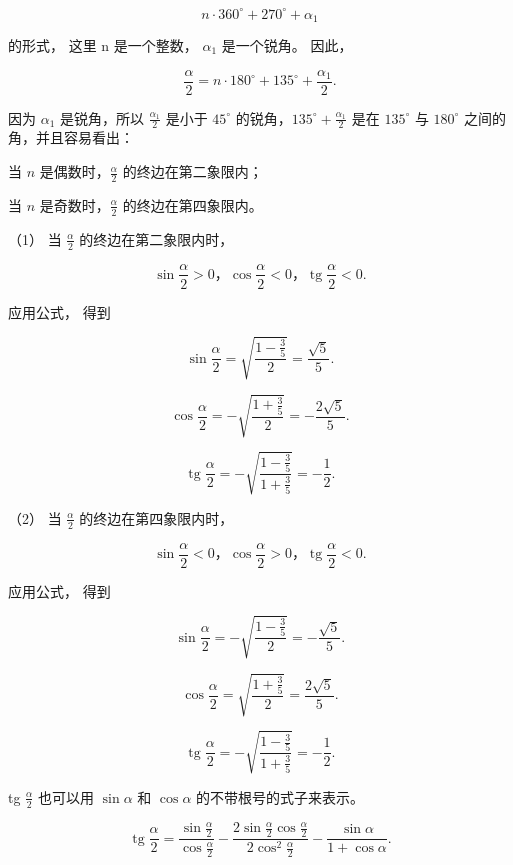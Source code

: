 \[
n\cdot360^{\circ} + 270 ^{\circ} + \alpha_ {1}
\]

的形式， 这里 n 是一个整数， \(\alpha_{1}\) 是一个锐角。 因此，

\[
\frac {\alpha}{2} = n \cdot 180 ^{\circ} + 135 ^{\circ} + \frac {\alpha_ {1}}{2}.
\]

因为 \(\alpha_{1}\) 是锐角，所以 \(\frac{\alpha_{1}}{2}\) 是小于
\(45^{\circ}\) 的锐角，\(135^{\circ} + \frac{\alpha_{1}}{2}\) 是在
\(135^{\circ}\) 与 \(180^{\circ}\) 之间的角，并且容易看出：

当 \(n\) 是偶数时，\(\frac{\alpha}{2}\) 的终边在第二象限内；

当 \(n\) 是奇数时，\(\frac{\alpha}{2}\) 的终边在第四象限内。

（1） 当 \(\frac{\alpha}{2}\) 的终边在第二象限内时，

\[
\sin \frac {\alpha}{2} > 0\text{，} \cos \frac {\alpha}{2} <   0\text{，} \operatorname{tg} \frac {\alpha}{2} <   0.
\]

应用公式， 得到

\[
\sin \frac {\alpha}{2} = \sqrt {\frac {1 - \frac {3}{5}}{2}} = \frac {\sqrt {5}}{5}.
\]

\[
\cos \frac {\alpha}{2} = - \sqrt {\frac {1 + \frac {3}{5}}{2}} = - \frac {2 \sqrt {5}}{5}.
\]

\[
\operatorname{tg} \frac {\alpha}{2} = - \sqrt {\frac {1 - \frac {3}{5}}{1 + \frac {3}{5}}} = - \frac {1}{2}.
\]

（2） 当 \(\frac{\alpha}{2}\) 的终边在第四象限内时，

\[
\sin \frac {\alpha}{2} <   0\text{，} \cos \frac {\alpha}{2} > 0\text{，} \operatorname{tg} \frac {\alpha}{2} <   0.
\]

应用公式， 得到

\[
\sin \frac {\alpha}{2} = - \sqrt {\frac {1 - \frac {3}{5}}{2}} = - \frac {\sqrt {5}}{5}.
\]

\[
\cos \frac {\alpha}{2} = \sqrt {\frac {1 + \frac {3}{5}}{2}} = \frac {2 \sqrt {5}}{5}.
\]

\[
\operatorname{tg} \frac {\alpha}{2} = - \sqrt {\frac {1 - \frac {3}{5}}{1 + \frac {3}{5}}} = - \frac {1}{2}.
\]

tg \(\frac{\alpha}{2}\) 也可以用 \(\sin \alpha\) 和 \(\cos \alpha\)
的不带根号的式子来表示。

\[
\operatorname{tg} \frac {\alpha}{2} = \frac {\sin \frac {\alpha}{2}}{\cos \frac {\alpha}{2}} - \frac {2 \sin \frac {\alpha}{2} \cos \frac {\alpha}{2}}{2 \cos^ {2} \frac {\alpha}{2}} - \frac {\sin \alpha}{1 + \cos \alpha}.
\]

